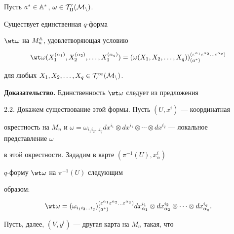  


\begin{props} Пусть $a^*\in\Bbb A^*$, $\omega\in\cal T^0_q(M_n)$. 


Существует единственная $q$-форма 


$\wt\omega$ на $M^{\Bbb A}_n$, удовлетворяющая условию 


\begin{equation} 


\wt\omega(X^{(\alpha_1)}_1,X^{(\alpha_2)}_2,\dotsc, 


X^{(\alpha_q)}_1)=(\omega(X_1,X_2,\dotsc,X_q) 


)^{(\varepsilon^{\alpha_1}\varepsilon^{\alpha_2}\dotsc 


\varepsilon^{\alpha_q})}_{(a^*)} 


\end{equation} 


для любых $X_1,X_2,\dotsc,X_q\in\cal T^1_0(M_n)$. 


\end{props} 


 


{\bf Доказательство.} Единственность $\wt\omega$ следует из предложения 


2.2.  Докажем существование этой формы. Пусть $(U,x^i)$ --- координатная 


окрестность на $M_n$ и $\omega=\omega_{i_1i_2\dotsc i_q}dx^{i_1}\otimes 


dx^{i_1}\otimes\dotsb\otimes dx^{i_q}$ --- локальное представление $\omega$ 


в этой окрестности. Зададим в карте $(\pi^{-1}(U),x^i_\alpha)$ 


$q$-форму $\wt\omega$ на $\pi^{-1}(U)$ следующим  


образом: 


\begin{equation} 


\wt\omega=(\omega_{i_1i_2\dotsc i_q} 


)^{(\varepsilon^{\alpha_1}\varepsilon^{\alpha_2}\dotsc 


\varepsilon^{\alpha_q})}_{(a^*)}dx^{i_1}_{\alpha_1}\otimes 


dx^{i_2}_{\alpha_2}\otimes\dotsb\otimes 


dx^{i_q}_{\alpha_q}. 


\end{equation} 


Пусть, далее, $(V,y^i)$ --- другая карта на $M_n$ такая, что


